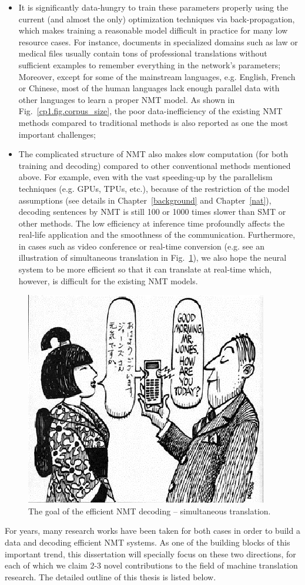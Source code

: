 \begin{itemize}
	\item  It is significantly data-hungry to train these parameters properly using the current (and almost the only) optimization techniques via back-propagation, which makes training a reasonable model difficult in practice for many low resource cases. 
For instance, documents in specialized domains such as law or medical files usually contain tons of professional translations without sufficient examples to remember everything in the network's parameters; Moreover, except for some of the mainstream languages, e.g. English, French or Chinese, most of the human languages lack enough parallel data with other languages to learn a proper NMT model. As shown in Fig.~\ref{cp1.fig.corpus_size}, the poor data-inefficiency of the existing NMT methods compared to traditional methods is also reported as one the most important challenges; 
\item The complicated structure of NMT also makes slow computation (for both training and decoding) compared to other  conventional methods mentioned above. For example, even with the vast speeding-up by the parallelism techniques (e.g. GPUs, TPUs, etc.), because of the restriction of the model assumptions (see details in Chapter~\ref{background} and Chapter~\ref{nat}), decoding sentences by NMT is still 100 or 1000 times slower than SMT or other methods. The low efficiency at inference time profoundly affects the real-life application and the smoothness of the communication. Furthermore, in cases such as video conference or real-time conversion (e.g. see an illustration of simultaneous translation in Fig.~\ref{cp1.fig.simultaneous}), we also hope the neural system to be more efficient so that it can translate at real-time which, however, is difficult for the existing NMT models. 
\end{itemize}
\begin{figure}[hptb]
\centering
\includegraphics[width=0.6\linewidth]{figs/intro/real_time.jpg}
\caption{\label{cp1.fig.simultaneous}The goal of the efficient NMT decoding -- simultaneous translation.}
\end{figure}
For years, many research works have been taken for both cases in order to build a data and decoding efficient NMT systems. As one of the building blocks of this important trend, this dissertation will specially focus on these two directions, for each of which we claim 2-3 novel contributions to the field of machine translation research. The detailed outline of this thesis is listed below.

